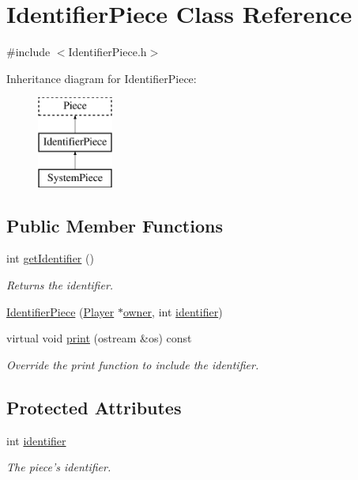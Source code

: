 \hypertarget{classIdentifierPiece}{\section{Identifier\-Piece Class Reference}
\label{classIdentifierPiece}
}


{\ttfamily \#include $<$Identifier\-Piece.\-h$>$}

Inheritance diagram for Identifier\-Piece\-:\begin{figure}[H]
\begin{center}
\leavevmode
\includegraphics[height=3.000000cm]{classIdentifierPiece}
\end{center}
\end{figure}
\subsection*{Public Member Functions}
\begin{DoxyCompactItemize}
\item 
int \hyperlink{classIdentifierPiece_aee7fb7f81fa27380620bf10294487b42}{get\-Identifier} ()
\begin{DoxyCompactList}\small\item\em Returns the identifier. \end{DoxyCompactList}\item 
\hyperlink{classIdentifierPiece_a88d7eedf40b3507a0bad13fd7179b87d}{Identifier\-Piece} (\hyperlink{classPlayer}{Player} $\ast$\hyperlink{classPiece_a43beac3b5268343b9f7e575d637eda98}{owner}, int \hyperlink{classIdentifierPiece_aab84613c911d8d7c269b9636ce6faa36}{identifier})
\item 
virtual void \hyperlink{classIdentifierPiece_a63030a6e3daf72f81d2731e809e30d5b}{print} (ostream \&os) const 
\begin{DoxyCompactList}\small\item\em Override the print function to include the identifier. \end{DoxyCompactList}\end{DoxyCompactItemize}
\subsection*{Protected Attributes}
\begin{DoxyCompactItemize}
\item 
int \hyperlink{classIdentifierPiece_aab84613c911d8d7c269b9636ce6faa36}{identifier}
\begin{DoxyCompactList}\small\item\em The piece's identifier. \end{DoxyCompactList}\end{DoxyCompactItemize}
